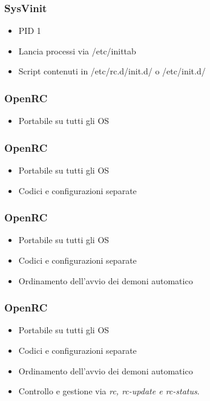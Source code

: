 \documentclass{beamer}
\begin{document}
\begin{frame}
	\frametitle{SysVinit}
	\begin{itemize}
		\item PID 1
		\item Lancia processi via /etc/inittab
		\item Script contenuti in /etc/rc.d/init.d/ o /etc/init.d/
	\end{itemize}	
\end{frame}



\begin{frame}
	\frametitle{OpenRC}
	\begin{itemize}
		\item Portabile su tutti gli OS
	\end{itemize}	 
\end{frame}


\begin{frame}
	\frametitle{OpenRC}
	\begin{itemize}
		\item Portabile su tutti gli OS
		\item Codici e configurazioni separate
	\end{itemize}	 
\end{frame}


\begin{frame}
	\frametitle{OpenRC}
	\begin{itemize}
		\item Portabile su tutti gli OS
		\item Codici e configurazioni separate
		\item Ordinamento dell'avvio dei demoni automatico
	\end{itemize}	 
\end{frame}


\begin{frame}
	\frametitle{OpenRC}
	\begin{itemize}
		\item Portabile su tutti gli OS
		\item Codici e configurazioni separate
		\item Ordinamento dell'avvio dei demoni automatico
		\item Controllo e gestione via \textit{rc, rc-update e rc-status}. 
	\end{itemize}	 
\end{frame}
\end{document}
